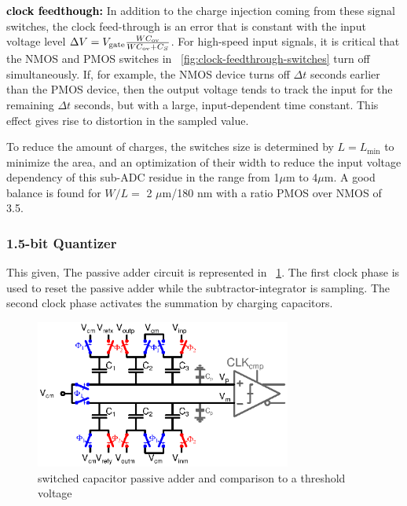 \textbf{\textcolor{black}{clock feedthough:}}
In addition to the charge injection coming from these signal switches, the clock feed-through is an error that is constant with the input voltage level \(\Delta V = V_{\rm gate} \frac{W C_{\rm ov}}{W C_{\rm ov}+C_S}\). For high-speed input signals, it is critical that the NMOS and PMOS switches in \figurename~\ref{fig:clock-feedthrough-switches} turn off simultaneously. If, for example, the NMOS device turns off \(\Delta t\) seconds earlier than the PMOS device, then the output voltage tends to track the input for the remaining \(\Delta t\) seconds, but with a large, input-dependent time constant. This effect gives rise to distortion in the sampled value.

To reduce the amount of charges, the switches size is determined by \(L=L_{\min}\) to minimize the area, and an optimization of their width to reduce the input voltage dependency of this sub-ADC residue in the range from 1\(\mu \)m to 4\(\mu \)m. A good balance is found for \(W/L = \) 2 \(\mu \)m/180 nm with a ratio PMOS over NMOS of 3.5.


	\subsubsection{1.5-bit Quantizer}             %
	\label{sec:isd-3-levels-quantizer}
This given, The passive adder circuit is represented in \figurename~\ref{fig:sc-pacth}. The first clock phase is used to reset the passive adder while the subtractor-integrator is sampling. The second clock phase activates the summation by charging capacitors.

\begin{figure}[htp]
	\centering
	\includegraphics[width=0.75\textwidth]{Chapter4/Figs/isd-passive-adder-comp.ps}
	\caption{switched capacitor passive adder and comparison to a threshold voltage}
	\label{fig:sc-pacth}
\end{figure}

